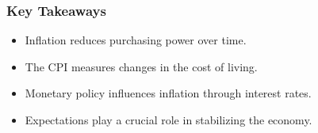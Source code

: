 \documentclass[aspectratio=169]{beamer}
\begin{document}
\begin{frame}
\transfade
\frametitle{Key Takeaways}
\begin{itemize}[<+->]
\item Inflation reduces purchasing power over time.
\item The CPI measures changes in the cost of living.
\item Monetary policy influences inflation through interest rates.
\item Expectations play a crucial role in stabilizing the economy.
\end{itemize}
\end{frame}
\end{document}
